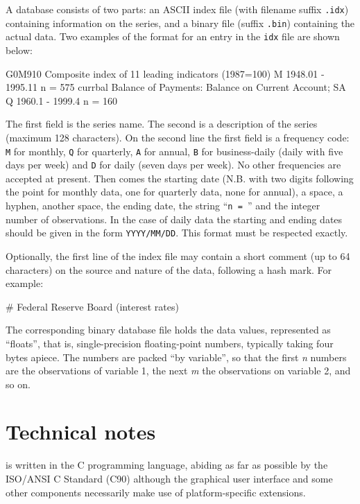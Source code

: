 A  database consists of two parts: an ASCII index file
(with filename suffix \verb+.idx+) containing information on the
series, and a binary file (suffix \verb+.bin+) containing the actual
data.  Two examples of the format for an entry in the \verb+idx+ file
are shown below:

\begin{code}
      G0M910  Composite index of 11 leading indicators (1987=100) 
      M 1948.01 - 1995.11  n = 575
      currbal Balance of Payments: Balance on Current Account; SA 
      Q 1960.1 - 1999.4 n = 160
\end{code}

The first field is the series name.  The second is a description of
the series (maximum 128 characters).  On the second line the first
field is a frequency code: \verb+M+ for monthly, \verb+Q+ for
quarterly, \verb+A+ for annual, \verb+B+ for business-daily (daily
with five days per week) and \verb+D+ for daily (seven days per week).
No other frequencies are accepted at present.  Then comes the starting
date (N.B. with two digits following the point for monthly data, one
for quarterly data, none for annual), a space, a hyphen, another
space, the ending date, the string ``\verb+n = +'' and the integer
number of observations. In the case of daily data the starting and
ending dates should be given in the form \verb+YYYY/MM/DD+. This
format must be respected exactly.

Optionally, the first line of the index file may contain a short
comment (up to 64 characters) on the source and nature of the data,
following a hash mark.  For example:

\begin{code}
      # Federal Reserve Board (interest rates)
\end{code}

The corresponding binary database file holds the data values,
represented as ``floats'', that is, single-precision floating-point
numbers, typically taking four bytes apiece.  The numbers are packed
``by variable'', so that the first \emph{n} numbers are the
observations of variable 1, the next \emph{m} the observations on
variable 2, and so on.

\chapter{Technical notes}
\label{app-technote}

 is written in the C programming language, abiding as far
as possible by the ISO/ANSI C Standard (C90) although the graphical
user interface and some other components necessarily make use of
platform-specific extensions.
  
